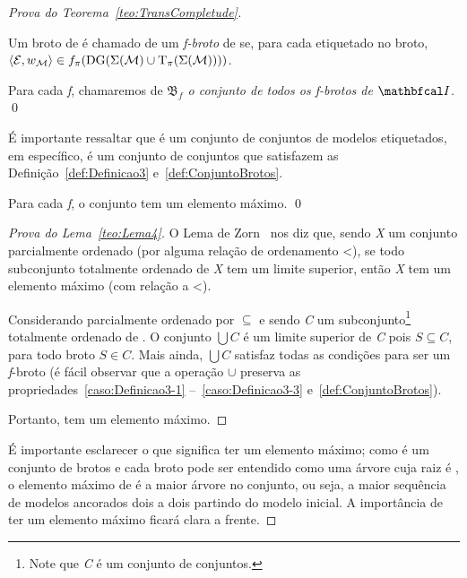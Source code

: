 \begin{apendicesenv}
\begin{proof}[Prova do Teorema~\ref{teo:TransCompletude}]
            \begin{definicao}
                \label{def:ConjuntoBrotos}
                Um broto de \Modeloinicial é chamado de um \textit{f-broto} de \Modeloinicial se, para cada \PImodelo etiquetado no broto,
                \(\langle \mathcal{E}, w_{\mathcal{M}} \rangle \in f_{\pi}(\operatorname{DG}(\Sigma(\mathcal{M}) \cup \operatorname{T}_{\pi}(\Sigma(\mathcal{M}))))\).

                Para cada \textit{f}, chamaremos de \textit{\(\mathfrak{B}_{f}\) o conjunto de todos os \textit{f}-brotos de \(\modeloinicial\)}. \qed
            \end{definicao}

            É importante ressaltar que  é um conjunto de conjuntos de modelos etiquetados, em específico, é um conjunto de conjuntos que satisfazem as
            Definição~\ref{def:Definicao3} e~\ref{def:ConjuntoBrotos}.

            \begin{lema}
                \label{teo:Lema4}
                Para cada \textit{f}, o conjunto  tem um elemento máximo. \qed
            \end{lema}

            \begin{proof}[Prova do Lema~\ref{teo:Lema4}]
                O Lema de Zorn~\cite{zorn1935remark} nos diz que, sendo \textit{X} um conjunto parcialmente ordenado (por alguma relação de ordenamento <), se todo
                subconjunto totalmente ordenado de \textit{X} tem um limite superior, então \textit{X} tem um elemento máximo (com relação a <).

                Considerando  parcialmente ordenado por \(\subseteq\) e sendo \textit{C} um subconjunto\footnote{Note que \textit{C} é um conjunto de conjuntos.}
                totalmente ordenado de . O conjunto \(\bigcup C\) é um limite superior de \textit{C} pois \(S \subseteq C\), para todo broto \(S \in C\).
                Mais ainda, \(\bigcup C\) satisfaz todas as condições para ser um \textit{f}-broto (é fácil observar que a operação \(\cup\) preserva as
                propriedades~\ref{caso:Definicao3-1} --~\ref{caso:Definicao3-3} e~\ref{def:ConjuntoBrotos}).

                Portanto,  tem um elemento máximo.
            \end{proof}

            É importante esclarecer o que significa  ter um elemento máximo; como  é um conjunto de brotos e cada broto pode ser entendido
            como uma árvore cuja raiz é \Modeloinicial, o elemento máximo de  é a maior árvore no conjunto, ou seja,
            a maior sequência de modelos ancorados dois a dois partindo do modelo inicial. A importância de  ter um elemento máximo ficará clara a frente.


\end{proof}
\end{apendicesenv}

